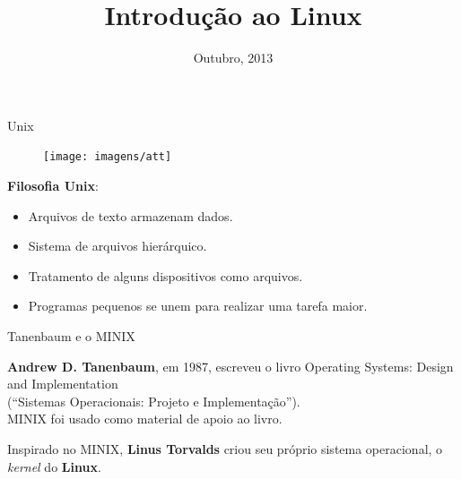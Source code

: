 \documentclass[size=14pt,
style=paintings
]{powerdot}
\title{Introdução ao Linux}
\date{Outubro, 2013}
\newenvironment{vslide}{\vspace{\stretch{1}}}{\vspace{\stretch{1}}}
\begin{document}
\maketitle

\begin{slide}{Unix}
{
   \begin{figure}[!h]
  \texttt{[image: imagens/att]}
   \end{figure}
}

\textbf{Filosofia Unix}:
\begin{itemize}
\item Arquivos de texto armazenam dados.
\item Sistema de arquivos hierárquico.
\item Tratamento de alguns dispositivos como arquivos.
\item Programas pequenos se unem para realizar uma tarefa maior.
\end{itemize}
\end{slide}

\begin{slide}{Tanenbaum e o MINIX}

\begin{vslide}
\textbf{Andrew D. Tanenbaum}, em 1987, escreveu o livro {\color{blue}Operating Systems: Design and Implementation}\\ (``Sistemas Operacionais: Projeto e Implementação'').
\\
\vspace{.5cm}
MINIX foi usado como material de apoio ao livro.

\vspace{0.5cm}
Inspirado no MINIX, \textbf{Linus Torvalds} criou seu próprio sistema operacional, o \textit{kernel} do \textbf{Linux}.
\vspace{0.5cm}
\end{vslide}

\end{slide}
\end{document}
